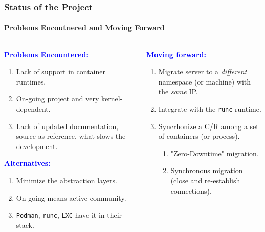 \documentclass[9pt,    %
    english,            %
    xcolor=table,       %
    envcountsect,        %
    aspectratio=169     %
]{beamer}
\begin{document}
\begin{frame}
    \frametitle{Status of the Project}
    \framesubtitle{Problems Encoutnered and Moving Forward}

    \begin{columns}[t]
        \begin{column}{.45\textwidth}
            \textbf{\textcolor{blue}{Problems Encountered:}}
            \begin{enumerate}
                \item Lack of support in container runtimes.
                \item On-going project and very kernel-dependent.
                \item Lack of updated documentation, source as reference, what slows the development.
            \end{enumerate}
            \textbf{\textcolor{blue}{Alternatives:}}
            \begin{enumerate}
                \item Minimize the abstraction layers.
                \item On-going means active community.
                \item \texttt{Podman}, \texttt{runc}, \texttt{LXC} have it in their stack.
            \end{enumerate}
        \end{column}
        \begin{column}{.45\textwidth}
            \textbf{\textcolor{blue}{Moving forward:}}
            \begin{enumerate}
                \item Migrate server to a \emph{different} namespace (or machine) with the \emph{same} IP.
                \item Integrate with the \texttt{runc} runtime.
                \item Syncrhonize a C/R among a set of containers (or process).
                \begin{enumerate}
                    \item "Zero-Downtime" migration.\\[5pt]
                    \item Synchronous migration (close and re-establish connections).
                \end{enumerate}
            \end{enumerate}
        \end{column}
    \end{columns}
    
\end{frame}
\end{document}
